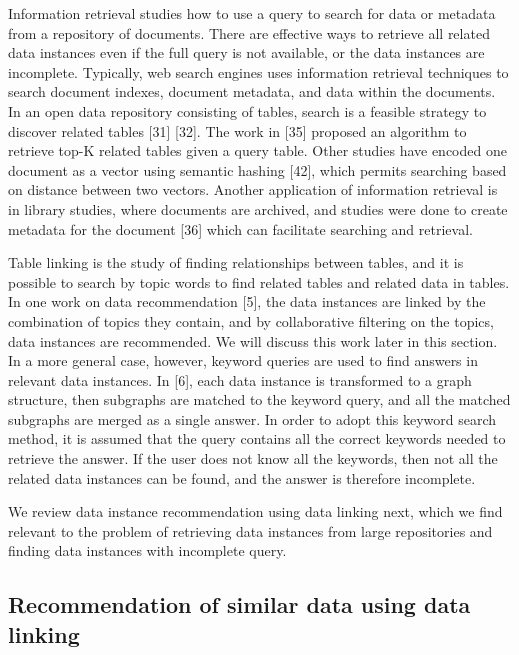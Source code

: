 Information retrieval studies how to use a query to search for data or metadata from a repository of documents. There are effective ways to retrieve all related data instances even if the full query is not available, or the data instances are incomplete. Typically, web search engines uses information retrieval techniques to search document indexes, document metadata, and data within the documents. In an open data repository consisting of tables, search is a feasible strategy to discover related tables \cite{Miller2018MakingOD}[31] \cite{10.14778/3229863.3240491}[32]. The work in \cite{Nargesian2018Table}[35] proposed an algorithm to retrieve top-K related tables given a query table. Other studies have encoded one document as a vector using semantic hashing \cite{Salakhutdinov2009Semantic}[42], which permits searching based on distance between two vectors. Another application of information retrieval is in library studies, where documents are archived, and studies were done to create metadata for the document \cite{Park2015Evaluation}[36] which can facilitate searching and retrieval.

Table linking is the study of finding relationships between tables, and it is possible to search by topic words to find related tables and related data in tables. In one work on data recommendation \cite{conf/esws/EllefiBDT16}[5], the data instances are linked by the combination of topics they contain, and by collaborative filtering on the topics, data instances are recommended. We will discuss this work later in this section. In a more general case, however, keyword queries are used to find answers in relevant data instances. In \cite{DBLP:journals/pvldb/ChanialDGLNM18}[6], each data instance is transformed to a graph structure, then subgraphs are matched to the keyword query, and all the matched subgraphs are merged as a single answer. In order to adopt this keyword search method, it is assumed that the query contains all the correct keywords needed to retrieve the answer. If the user does not know all the keywords, then not all the related data instances can be found, and the answer is therefore incomplete.

We review data instance recommendation using data linking next, which we find relevant to the problem of retrieving data instances from large repositories and finding data instances with incomplete query.

\subsection{Recommendation of similar data using data linking}

